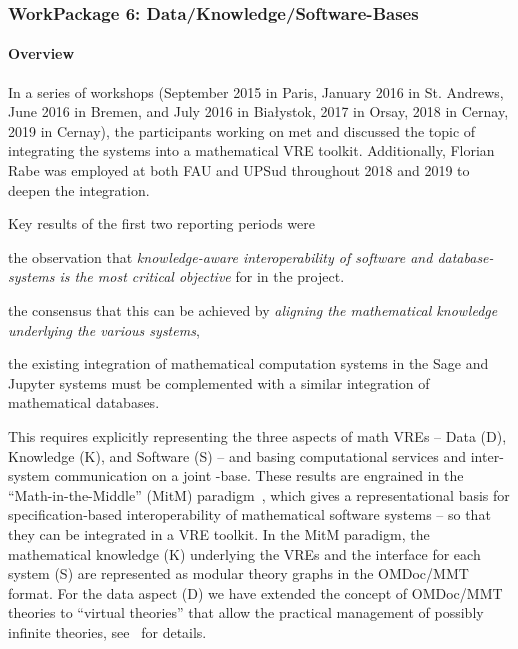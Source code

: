 \subsubsection{WorkPackage 6:  Data/Knowledge/Software-Bases}\label{dksbases}

\paragraph{Overview}

In a series of workshops (September 2015 in Paris, January 2016 in St. Andrews, June 2016 in Bremen, and July 2016 in Bia{\l}ystok, 2017 in Orsay, 2018 in Cernay, 2019 in Cernay), the participants working on  met and discussed the topic of integrating the \pn systems into a mathematical VRE toolkit.
Additionally, Florian Rabe was employed at both FAU and UPSud throughout 2018 and 2019 to deepen the integration.

Key results of the first two reporting periods were
\begin{compactitem}[\bf R1.]
\item the observation that \emph{knowledge-aware interoperability of software and database-systems is the most critical objective} for  in the \pn project.
\item the consensus that this can be achieved by \emph{aligning the mathematical knowledge underlying the various systems},
\item the existing integration of mathematical computation systems in the Sage and Jupyter systems must be complemented with a similar integration of mathematical databases.
\end{compactitem}
This requires explicitly representing the three aspects of math VREs -- Data (D), Knowledge (K), and Software (S) -- and basing computational services and inter-system communication on a joint \DKS-base.
These results are engrained in the ``Math-in-the-Middle'' (MitM) paradigm~\cite{DehKohKon:iop16}, which gives a representational basis for specification-based interoperability of mathematical software systems -- so that they can be integrated in a VRE toolkit.
In the MitM paradigm, the mathematical knowledge (K) underlying the VREs and the interface for each system (S) are represented as modular theory graphs in the OMDoc/MMT format.
For the data aspect (D) we have extended the concept of OMDoc/MMT theories to ``virtual theories'' that allow the practical management of possibly infinite theories, see~\cite{ODK-D6.5} for details.

